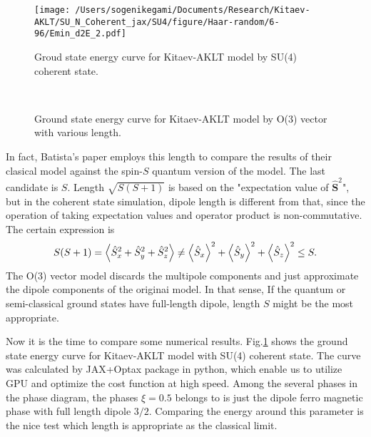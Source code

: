 \documentclass[11pt, aps, longbibliography]{article}
\begin{document}
\begin{figure}[t]
    \centering
    \texttt{[image: /Users/sogenikegami/Documents/Research/Kitaev-AKLT/SU\_N\_Coherent\_jax/SU4/figure/Haar-random/6-96/Emin\_d2E\_2.pdf]}
    \caption{Groud state energy curve for Kitaev-AKLT model by SU(4) coherent state.}
    \label{fig:SU4-K-AKLT}
\end{figure}

\begin{figure}[t]
    \centering
     \\
    \caption{Ground state energy curve for Kitaev-AKLT model by O(3) vector with various length.}
    \label{fig:O3-K-AKLT}
\end{figure}


In fact, Batista's paper \cite{PhysRevB.96.134408} employs this length to compare the results of their clasical model against the spin-$S$ quantum version of the model.
The last candidate is $S$. Length $\sqrt{S(S+1)}$ is based on the "expectation value of $\hat{\mathbf{S}}^2$", but in the coherent state simulation, dipole length is different from that, since 
the operation of taking expectation values and operator product is non-commutative. The certain expression is
\begin{equation}
    S(S+1) = \expval{\hat{S}_x^2 + \hat{S}_y^2 + \hat{S}_z^2} \neq \expval{\hat{S}_x}^2 + \expval{\hat{S}_y}^2 + \expval{\hat{S}_z}^2 \leq S.
\end{equation}
The O(3) vector model discards the multipole components and just approximate the dipole components of the originai model. In that sense, If the quantum or semi-classical ground states have
full-length dipole, length $S$ might be the most appropriate. 


Now it is the time to compare some numerical results. 
Fig.\ref{fig:SU4-K-AKLT} shows the ground state energy curve for Kitaev-AKLT model with SU(4) coherent state. 
The curve was calculated by JAX+Optax package in python, which enable us to utilize GPU and optimize the cost function at high speed.
Among the several phases in the phase diagram, the phases $\xi=0.5$ belongs to is just the dipole ferro magnetic phase with full length dipole $3/2$.
Comparing the energy around this parameter is the nice test which length is appropriate as the classical limit. 
\end{document}
